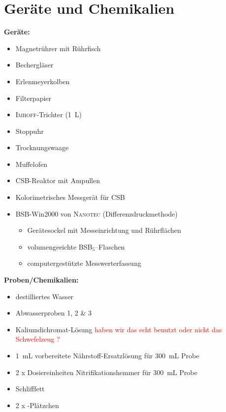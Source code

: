 \chapter{Geräte und Chemikalien}
\label{sec:geraete}

\textbf{Geräte:}
\begin{itemize}
	\item Magnetrührer mit Rührfisch
	\item Bechergläser
	\item Erlenmeyerkolben
	\item Filterpapier
	\item \textsc{Imhoff}-Trichter (\SI{1}{\liter})
	\item Stoppuhr
	\item Trocknungswaage
	\item Muffelofen
	\item CSB-Reaktor mit Ampullen
	\item Kolorimetrisches Messgerät für CSB
	\item BSB-Win2000 von \textsc{Nanotec} (Differenzdruckmethode)
		\begin{itemize}
			\item Gerätesockel mit Messeinrichtung und Rührflächen
			\item volumengeeichte BSB$_5$–Flaschen
			\item computergestützte Messwerterfassung 
		\end{itemize}
	
\end{itemize}

\vspace*{5mm}

\textbf{Proben/Chemikalien:}
\begin{itemize}
	\item destilliertes Wasser
	\item Abwasserproben 1, 2 \& 3
	\item Kaliumdichromat-Lösung \textcolor{red}{haben wir das echt benutzt oder nicht das Schwefelzeug ?}
	\item \SI{1}{\milli \liter} vorbereitete Nährstoff-Ersatzlösung für \SI{300}{\milli \liter} Probe
	\item 2 x Dosiereinheiten Nitrifikationshemmer für \SI{300}{\milli \liter} Probe
	\item Schlifffett
	\item 2 x -Plätzchen
\end{itemize}




